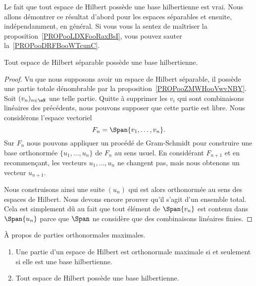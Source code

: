 Le fait que tout espace de Hilbert possède une base hilbertienne est vrai. Nous allons démontrer ce résultat d'abord pour les espaces séparables et ensuite, indépendamment, en général. Si vous vous la sentez de maîtriser la proposition~\ref{PROPooLDXFooRaxBsI}, vous pouvez sauter la~\ref{PROPooDRFBooWTcunC}.
\begin{proposition}     \label{PROPooDRFBooWTcunC}
	Tout espace de Hilbert séparable possède une base hilbertienne.
\end{proposition}

\begin{proof}
	Vu que nous supposons avoir un espace de Hilbert séparable, il possède une partie totale dénombrable par la proposition~\ref{PROPooZMWHooVwvNBY}. Soit  \( (v_n)_{n\in \eN}\) une telle partie. Quitte à supprimer les \( v_i\) qui sont combinaisons linéaires des précédents, nous pouvons supposer que cette partie est libre. Nous considérons l'espace vectoriel
	\begin{equation}
		F_n=\Span\{ v_1,\ldots, v_n \}.
	\end{equation}
	Sur \( F_n\) nous pouvons appliquer un procédé de Gram-Schmidt pour construire une base orthonormée \( \{ u_1,\ldots, u_n \}\) de \( F_n\) au sens usuel. En considérant \( F_{n+1}\) et en recommençant, les vecteurs \( u_1,\ldots, u_n\) ne changent pas, mais nous obtenons un vecteur \( u_{n+1}\).

	Nous construisons ainsi une suite \( (u_n)\) qui est alors orthonormée au sens des espaces de Hilbert. Nous devons encore prouver qu'il s'agit d'un ensemble total. Cela est simplement dû au fait que tout élément de \( \Span\{ v_n \}\) est contenu dans \( \Span\{ u_n \}\) parce que \( \Span\) ne considère que des combinaisons linéaires finies.
\end{proof}

\begin{proposition}      \label{PROPooLDXFooRaxBsI}
	À propos de parties orthonormales maximales.
	\begin{enumerate}
		\item           \label{ITEMooVUFXooDrVwum}
		      Une partie d'un espace de Hilbert est orthonormale maximale si et seulement si elle est une base hilbertienne.
		\item       \label{ITEMooZFENooQnSlrv}
		      Tout espace de Hilbert possède une base hilbertienne.
	\end{enumerate}
\end{proposition}

